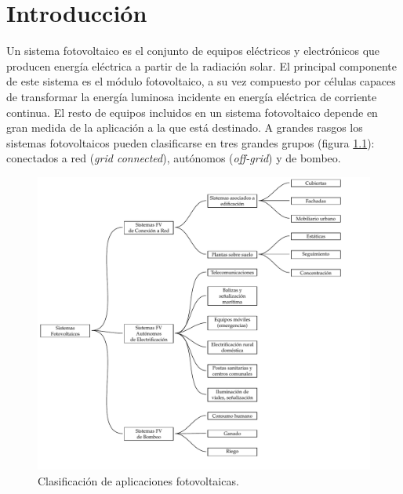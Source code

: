 
\chapter{Introducción}

Un sistema fotovoltaico es el conjunto de equipos eléctricos y electrónicos
que producen energía eléctrica a partir de la radiación solar. El
principal componente de este sistema es el módulo fotovoltaico, a
su vez compuesto por células capaces de transformar la energía luminosa
incidente en energía eléctrica de corriente continua. El resto de
equipos incluidos en un sistema fotovoltaico depende en gran medida
de la aplicación a la que está destinado. A grandes rasgos los sistemas
fotovoltaicos pueden clasificarse en tres grandes grupos (figura \ref{fig:ClasificacionAplicaciones}):
conectados a red (\emph{grid connected}), autónomos (\emph{off-grid})
y de bombeo.

%
\begin{figure}


\begin{centering}
\includegraphics[scale=0.8]{../figs/ClasificacionSistemas}\caption{Clasificación de aplicaciones fotovoltaicas.\label{fig:ClasificacionAplicaciones}}

\end{centering}


\end{figure}



